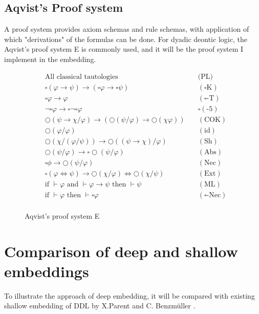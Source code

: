 \documentclass[sigconf,11pt]{acmart}
\begin{document}
\subsection{Aqvist's Proof system}
A proof system provides axiom schemas and rule schemas, with application of which "derivations" of the formulas can be done. For dyadic deontic logic, the Aqvist's proof system E is commonly used, and it will be the proof system I implement in the embedding.
\begin{figure}
	\begin{align*}
	&\text{All classical tautologies} & \quad\text{(PL)}\\
	&\square(\varphi \to \psi) \to (\square\varphi \to \square\psi)& \quad(\square\text{K})\\
	&\square\varphi \to \varphi &\quad (\square\text{-T})\\	
	&\neg\square\varphi \to \square\neg\square\varphi&\quad \square(\text{-5})\\
	&\bigcirc(\psi \to \chi/\varphi) \to (\bigcirc(\psi/\varphi)\to \bigcirc(\chi\varphi))&\quad (\text{COK})\\
	&\bigcirc(\varphi/\varphi)&\quad (\text{id})\\
	&\bigcirc(\chi/(\varphi/\psi)) \to \bigcirc((\psi\to\chi)/\varphi)&\quad (\text{Sh})\\
	&\bigcirc(\psi/\varphi) \to \square\bigcirc(\psi/\varphi)&\quad (\text{Abs})\\
	&\square\phi \to \bigcirc(\psi/\varphi)&\quad (\text{Nec})\\            
	&\square(\varphi \iff \psi) \to \bigcirc(\chi/\varphi) \iff \bigcirc(\chi/\psi)&\quad (\text{Ext})\\
	& \text{if } \vdash \varphi\text{ and }\vdash \varphi \to \psi\text{ then }\vdash \psi&\quad (\text{ML})\\
	& \text{if }\vdash \varphi \text{ then }\vdash \square \varphi&\quad (\square\text{-Nec})\\     
	\end{align*}
\caption{Aqvist's proof system E}
\end{figure}

\section{Comparison of deep and shallow embeddings}
To illustrate the approach of deep embedding, it will be compared with existing shallow embedding of DDL by X.Parent and C. Benzmüller \cite{shallow}. 
\end{document}
